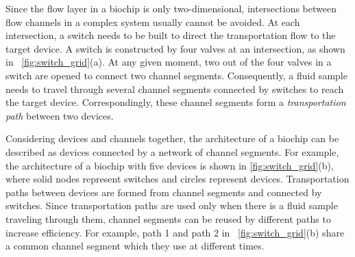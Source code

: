 Since the flow layer in a biochip is only two-dimensional, 
intersections between flow channels in a complex system
usually cannot be avoided. At each intersection, a switch needs to be built 
to direct the transportation flow to the target device. 
A switch is constructed by four valves at an intersection, 
as shown in \figname~\ref{fig:switch_grid}(a). At any
given moment, two out of the four valves in a switch are opened to 
connect two channel segments.  Consequently, 
a fluid sample needs to travel through several channel segments connected by
switches to reach the target device. 
Correspondingly, these channel segments form a  
\textit{transportation path} between two devices.


Considering devices and channels together, the architecture of a biochip can
be described as devices connected by a network of channel segments. %
For example, the architecture of a biochip 
with five devices is 
shown in \ref{fig:switch_grid}(b), where solid nodes
represent switches and circles represent devices. 
Transportation paths between devices are
formed from channel segments and connected by switches. %
Since transportation paths are used only when there is a fluid sample
traveling through them, channel segments can be reused by
different paths to increase efficiency. %
For example,  path 
1 and path 2 in \figname~\ref{fig:switch_grid}(b) 
share a common channel segment which they use at different times.



